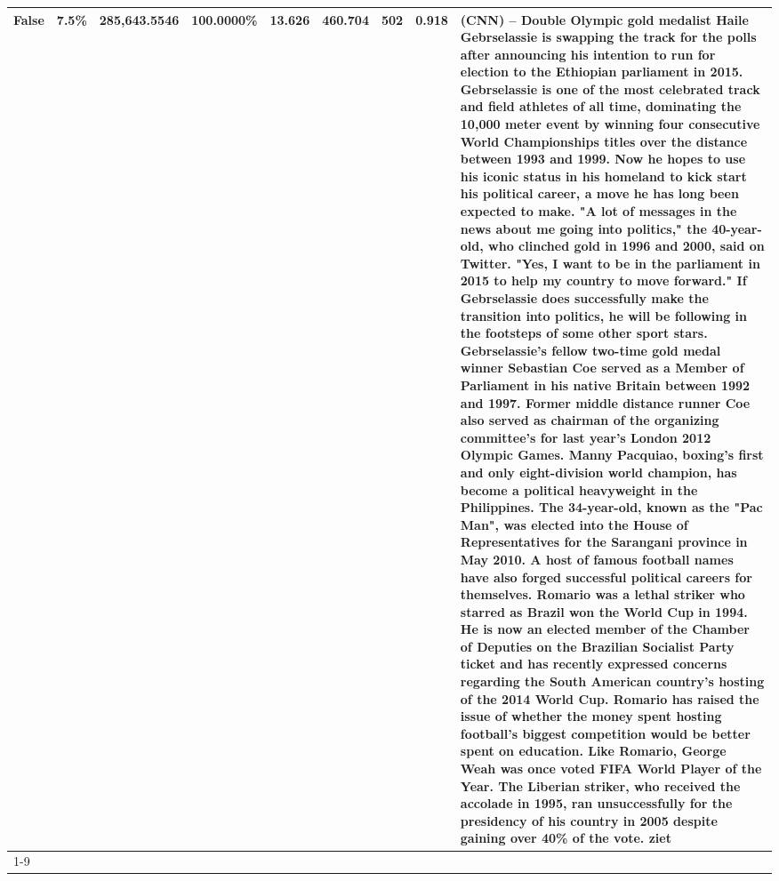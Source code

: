 \begin{table}[H]
{\begin{tabular}{lllrlllll}
False & 7.5\% & 285,643.5546 & \bfseries \color{red} 100.0000\% & 13.626 & 460.704 & 502 & 0.918 & (CNN) -- Double Olympic gold medalist Haile Gebrselassie is swapping the track for the polls after announcing his intention to run for election to the Ethiopian parliament in 2015. Gebrselassie is one of the most celebrated track and field athletes of all time, dominating the 10,000 meter event by winning four consecutive World Championships titles over the distance between 1993 and 1999. Now he hopes to use his iconic status in his homeland to kick start his political career, a move he has long been expected to make. "A lot of messages in the news about me going into politics," the 40-year-old, who clinched gold in 1996 and 2000, said on Twitter. "Yes, I want to be in the parliament in 2015 to help my country to move forward." If Gebrselassie does successfully make the transition into politics, he will be following in the footsteps of some other sport stars. Gebrselassie's fellow two-time gold medal winner Sebastian Coe served as a Member of Parliament in his native Britain between 1992 and 1997. Former middle distance runner Coe also served as chairman of the organizing committee's for last year's London 2012 Olympic Games. Manny Pacquiao, boxing's first and only eight-division world champion, has become a political heavyweight in the Philippines. The 34-year-old, known as the "Pac Man", was elected into the House of Representatives for the Sarangani province in May 2010. A host of famous football names have also forged successful political careers for themselves. Romario was a lethal striker who starred as Brazil won the World Cup in 1994. He is now an elected member of the Chamber of Deputies on the Brazilian Socialist Party ticket and has recently expressed concerns regarding the South American country's hosting of the 2014 World Cup. Romario has raised the issue of whether the money spent hosting football's biggest competition would be better spent on education. Like Romario, George Weah was once voted FIFA World Player of the Year. The Liberian striker, who received the accolade in 1995, ran unsuccessfully for the presidency of his country in 2005 despite gaining over 40\% of the vote. ziet \\
\cline{1-9}

\end{tabular}}
\end{table}
